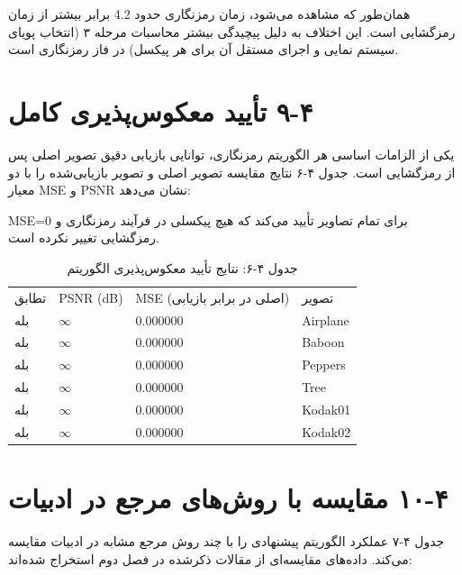 همان‌طور که مشاهده می‌شود، زمان رمزنگاری حدود 4.2 برابر بیشتر از زمان رمزگشایی است. این اختلاف به دلیل پیچیدگی بیشتر محاسبات مرحله ۳ (انتخاب پویای سیستم نمایی و اجرای مستقل آن برای هر پیکسل) در فاز رمزنگاری است.

\section{‏۴‏-‏۹‏ تأیید معکوس‌پذیری کامل}

یکی از الزامات اساسی هر الگوریتم رمزنگاری، توانایی بازیابی دقیق تصویر اصلی پس از رمزگشایی است. جدول ۴-۶ نتایج مقایسه تصویر اصلی و تصویر بازیابی‌شده را با دو معیار MSE و PSNR نشان می‌دهد:

MSE=0 برای تمام تصاویر تأیید می‌کند که هیچ پیکسلی در فرآیند رمزنگاری و رمزگشایی تغییر نکرده است.

\begin{table}[h]
\centering
\small
\begin{tabular}{llll}
\hline
تطابق & PSNR (dB) & MSE  (اصلی در برابر بازیابی) & تصویر \\
بله & $\infty$ & 0.000000 & Airplane \\
بله & $\infty$ & 0.000000 & Baboon \\
بله & $\infty$ & 0.000000 & Peppers \\
بله & $\infty$ & 0.000000 & Tree \\
بله & $\infty$ & 0.000000 & Kodak01 \\
بله & $\infty$ & 0.000000 & Kodak02 \\
\hline
\end{tabular}
\caption{جدول ‏۴‏-‏۶‏: نتایج تأیید معکوس‌پذیری الگوریتم}
\end{table}

\section{‏۴‏-‏۱۰‏ مقایسه با روش‌های مرجع در ادبیات}

جدول ۴-۷ عملکرد الگوریتم پیشنهادی را با چند روش مرجع مشابه در ادبیات مقایسه می‌کند. داده‌های مقایسه‌ای از مقالات ذکرشده در فصل دوم استخراج شده‌اند:

\begin{table}[h]
\centering
\footnotesize
{}
\caption{جدول ‏۴‏-‏۷‏: مقایسه الگوریتم پیشنهادی با روش‌های مرجع}
\end{table}

